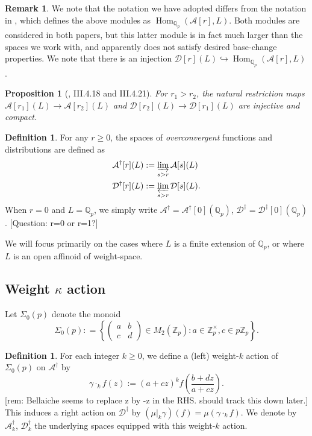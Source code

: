 \documentclass[10pt]{amsart}
\theoremstyle{plain}
\newtheorem{proposition}[theorem]{Proposition}
\theoremstyle{definition}
\newtheorem{definition}[theorem]{Definition}
\newtheorem{remark}[theorem]{Remark}
\newcommand{\ZZ}{{\mathbb{Z}}}
\newcommand{\QQ}{{\mathbb{Q}}}
\newcommand{\cA}{\mathcal{A}}
\newcommand{\cD}{\mathcal{D}}
\DeclareMathOperator{\Hom}{Hom}
\begin{document}
\begin{remark}
We note that the notation we have adopted differs from the notation in \cite{HarronPollack}, which defines the above modules as $\Hom_{\QQ_p}(\cA[r],L)$. Both modules are considered in both papers, but this latter module is in fact much larger than the spaces we work with, and apparently does not satisfy desired base-change properties. We note that there is an injection $\cD[r](L)\hookrightarrow \Hom_{\QQ_p} (\cA[r], L)$.
\end{remark}

\begin{proposition}[\cite{Bellaiche}, III.4.18 and III.4.21] For $r_1> r_2$, the natural restriction maps $\cA[r_1](L)\rightarrow \cA[r_2](L)$  and $\cD[r_2](L)\rightarrow \cD[r_1](L)$ are injective and compact.
\end{proposition}

\begin{definition}
For any $r\geq 0$, the spaces of \emph{overconvergent} functions and distributions are defined as
\begin{align}
	\cA^\dagger[r](L) &:= \varinjlim_{s>r} \cA[s](L)\\
	\cD^\dagger[r](L) &:=\varprojlim_{s>r} \cD[s](L).
\end{align}
When $r=0$ and $L=\QQ_p$, we simply write $\cA^\dagger = \cA^\dagger[0](\QQ_p)$, $\cD^\dagger = \cD^\dagger[0](\QQ_p)$.
[Question: r=0 or r=1?]
\end{definition}
We will focus primarily on the cases where $L$ is a finite extension of $\QQ_p$, or where $L$ is an open affinoid of weight-space.

\subsection{Weight $\kappa$ action}
Let $\Sigma_0(p)$ denote the monoid
\begin{equation*}
	\Sigma_0(p) : = \left\{ \begin{pmatrix} a & b \\ c & d\end{pmatrix}\in M_2(\ZZ_p) : a\in \ZZ_p^\times, c\in p\ZZ_p\right\}.
\end{equation*}

\begin{definition}
For each integer $k\geq 0$, we define a (left) weight-$k$ action of $\Sigma_0(p)$ on $\cA^\dagger$ by 
\begin{equation}
	\gamma \cdot_k f(z) := (a+cz)^k f\left(\frac{b+dz}{a+cz}\right).
\end{equation}
[rem: Bellaiche seems to replace z by -z in the RHS. should track this down later.]
This induces a right action on $\cD^\dagger$ by $(\mu|_k\gamma) (f) = \mu(\gamma\cdot_k f)$. We denote by $\cA_k^\dagger$, $\cD_k^\dagger$ the underlying spaces equipped with this weight-$k$ action.
\end{definition}
\end{document}
